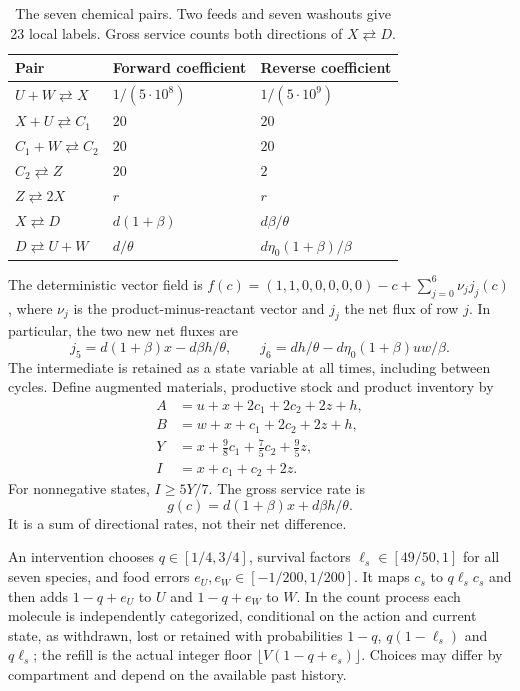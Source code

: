 \documentclass[11pt]{article}
\theoremstyle{definition}\newtheorem{definition}[theorem]{Definition}
\begin{document}
\begin{table}[ht]
\centering
\begin{tabular}{lll}
\toprule Pair & Forward coefficient & Reverse coefficient\\\midrule
$U+W\rightleftarrows X$ & $1/(5\cdot10^8)$ & $1/(5\cdot10^9)$\\
$X+U\rightleftarrows C_1$ & $20$ & $20$\\
$C_1+W\rightleftarrows C_2$ & $20$ & $20$\\
$C_2\rightleftarrows Z$ & $20$ & $2$\\
$Z\rightleftarrows 2X$ & $r$ & $r$\\
$X\rightleftarrows D$ & $d(1+\beta)$ & $d\beta/\theta$\\
$D\rightleftarrows U+W$ & $d/\theta$ & $d\eta_0(1+\beta)/\beta$\\
\bottomrule
\end{tabular}
\caption{The seven chemical pairs. Two feeds and seven washouts give 23 local labels.
Gross service counts both directions of $X\rightleftarrows D$.}
\label{tab:chemistry}
\end{table}

The deterministic vector field is $f(c)=(1,1,0,0,0,0,0)-c+\sum_{j=0}^6\nu_j j_j(c)$,
where $\nu_j$ is the product-minus-reactant vector and $j_j$ the net flux of row $j$.
In particular, the two new net fluxes are
\begin{equation}\label{eq:newflux}
j_5=d(1+\beta)x-d\beta h/\theta,\qquad
j_6=dh/\theta-d\eta_0(1+\beta)uw/\beta.
\end{equation}
The intermediate is retained as a state variable at all times, including between cycles.
Define augmented materials, productive stock and product inventory by
\begin{align}
 A&=u+x+2c_1+2c_2+2z+h,\\
 B&=w+x+c_1+2c_2+2z+h,\\
 Y&=x+\tfrac98c_1+\tfrac75c_2+\tfrac95z,\\
 I&=x+c_1+c_2+2z.
\end{align}
For nonnegative states, $I\ge5Y/7$. The gross service rate is
\begin{equation}\label{eq:service}
g(c)=d(1+\beta)x+d\beta h/\theta.
\end{equation}
It is a sum of directional rates, not their net difference.

An intervention chooses $q\in[1/4,3/4]$, survival factors
$\ell_s\in[49/50,1]$ for all seven species, and food errors
$e_U,e_W\in[-1/200,1/200]$. It maps $c_s$ to $q\ell_s c_s$ and then adds
$1-q+e_U$ to $U$ and $1-q+e_W$ to $W$. In the count process each molecule
is independently categorized, conditional on the action and current state, as withdrawn, lost or retained with probabilities
$1-q$, $q(1-\ell_s)$ and $q\ell_s$; the refill is the actual integer floor
$\lfloor V(1-q+e_s)\rfloor$. Choices may differ by compartment and depend on
the available past history.
\end{document}
